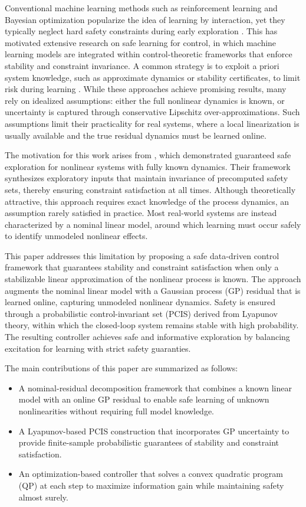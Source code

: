 \documentclass[10pt]{article}
\newcommand{\1}{\mathbbm{1}}
\begin{document}
Conventional machine learning methods such as reinforcement learning and Bayesian optimization popularize the idea of learning by interaction, yet they typically neglect hard safety constraints during early exploration \citep{hewing2020learning}. This has motivated extensive research on safe learning for control, in which machine learning models are integrated within control-theoretic frameworks that enforce stability and constraint invariance. A common strategy is to exploit a priori system knowledge, such as approximate dynamics or stability certificates, to limit risk during learning \citep{Berkenkamp2016,Koller2018SafeMPC,wang2025robust, rastegarpour2024enhancing, rastegarpour2025adaptive, pawlak2025hybrid}. While these approaches achieve promising results, many rely on idealized assumptions: either the full nonlinear dynamics is known, or uncertainty is captured through conservative Lipschitz over-approximations. Such assumptions limit their practicality for real systems, where a local linearization is usually available and the true residual dynamics must be learned online.

The motivation for this work arises from \cite{prajapat2025safe}, which demonstrated guaranteed safe exploration for nonlinear systems with fully known dynamics. Their framework synthesizes exploratory inputs that maintain invariance of precomputed safety sets, thereby ensuring constraint satisfaction at all times. Although theoretically attractive, this approach requires exact knowledge of the process dynamics, an assumption rarely satisfied in practice. Most real-world systems are instead characterized by a nominal linear model, around which learning must occur safely to identify unmodeled nonlinear effects.

This paper addresses this limitation by proposing a safe data-driven control framework that guarantees stability and constraint satisfaction when only a stabilizable linear approximation of the nonlinear process is known. The approach augments the nominal linear model with a Gaussian process (GP) residual that is learned online, capturing unmodeled nonlinear dynamics. Safety is ensured through a probabilistic control-invariant set (PCIS) derived from Lyapunov theory, within which the closed-loop system remains stable with high probability. The resulting controller achieves safe and informative exploration by balancing excitation for learning with strict safety guaranties.

The main contributions of this paper are summarized as follows:
\begin{itemize}
\item A nominal-residual decomposition framework that combines a known linear model with an online GP residual to enable safe learning of unknown nonlinearities without requiring full model knowledge.
\item A Lyapunov-based PCIS construction that incorporates GP uncertainty to provide finite-sample probabilistic guarantees of stability and constraint satisfaction.
\item An optimization-based controller that solves a convex quadratic program (QP) at each step to maximize information gain while maintaining safety almost surely.
\end{itemize}
\end{document}
